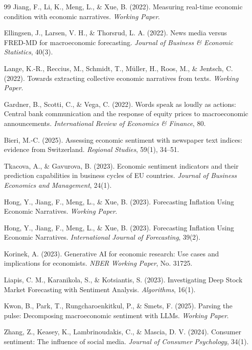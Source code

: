 \documentclass[11pt]{article}
\begin{document}
\begin{thebibliography}{99}
 Jiang, F., Li, K., Meng, L., \& Xue, B. (2022). Measuring real-time economic condition with economic narratives. \textit{Working Paper}.

 Ellingsen, J., Larsen, V. H., \& Thorsrud, L. A. (2022). News media versus FRED-MD for macroeconomic forecasting. \textit{Journal of Business \& Economic Statistics}, 40(3).

 Lange, K.-R., Reccius, M., Schmidt, T., Müller, H., Roos, M., \& Jentsch, C. (2022). Towards extracting collective economic narratives from texts. \textit{Working Paper}.

 Gardner, B., Scotti, C., \& Vega, C. (2022). Words speak as loudly as actions: Central bank communication and the response of equity prices to macroeconomic announcements. \textit{International Review of Economics \& Finance}, 80.

 Bieri, M.-C. (2025). Assessing economic sentiment with newspaper text indices: evidence from Switzerland. \textit{Regional Studies}, 59(1), 34--51.

 Tkacova, A., \& Gavurova, B. (2023). Economic sentiment indicators and their prediction capabilities in business cycles of EU countries. \textit{Journal of Business Economics and Management}, 24(1).

 Hong, Y., Jiang, F., Meng, L., \& Xue, B. (2023). Forecasting Inflation Using Economic Narratives. \textit{Working Paper}.

 Hong, Y., Jiang, F., Meng, L., \& Xue, B. (2023). Forecasting Inflation Using Economic Narratives. \textit{International Journal of Forecasting}, 39(2).

 Korinek, A. (2023). Generative AI for economic research: Use cases and implications for economists. \textit{NBER Working Paper}, No. 31725.

 Liapis, C. M., Karanikola, S., \& Kotsiantis, S. (2023). Investigating Deep Stock Market Forecasting with Sentiment Analysis. \textit{Algorithms}, 16(1).

 Kwon, B., Park, T., Rungcharoenkitkul, P., \& Smets, F. (2025). Parsing the pulse: Decomposing macroeconomic sentiment with LLMs. \textit{Working Paper}.

 Zhang, Z., Keasey, K., Lambrinoudakis, C., \& Mascia, D. V. (2024). Consumer sentiment: The influence of social media. \textit{Journal of Consumer Psychology}, 34(1).


\end{thebibliography}
\end{document}
